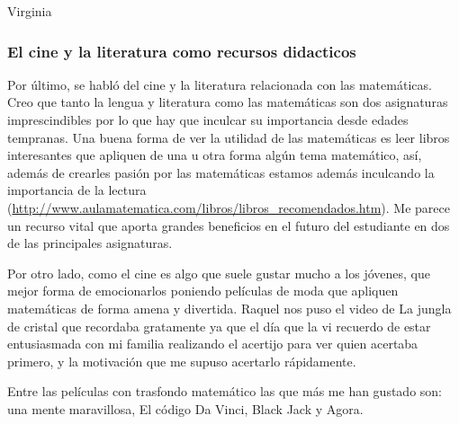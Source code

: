 \begin{opin}{\virgicolor}{Virginia}
\subsubsection{El cine y la literatura como recursos didacticos}
Por último, se habló del cine y la literatura relacionada con las matemáticas. Creo que tanto la lengua y literatura como las matemáticas son dos asignaturas imprescindibles por lo que hay que inculcar su importancia desde edades tempranas. Una buena forma de ver la utilidad de las matemáticas es leer libros interesantes que apliquen de una u otra forma algún tema matemático, así, además de crearles pasión por las matemáticas estamos además inculcando la importancia de la lectura (\url{http://www.aulamatematica.com/libros/libros_recomendados.htm}). Me parece un recurso vital que aporta grandes beneficios en el futuro del estudiante en dos de las principales asignaturas.

Por otro lado, como el cine es algo que suele gustar mucho a los jóvenes, que mejor forma de emocionarlos poniendo películas de moda que apliquen matemáticas de forma amena y divertida. Raquel nos puso el video de La jungla de cristal que recordaba gratamente ya que el día que la vi recuerdo de estar entusiasmada con mi familia realizando el acertijo para ver quien acertaba primero, y la motivación que me supuso acertarlo rápidamente.

Entre las películas con trasfondo matemático las que más me han gustado son: una mente maravillosa, El código Da Vinci, Black Jack y Agora.

\end{opin}
